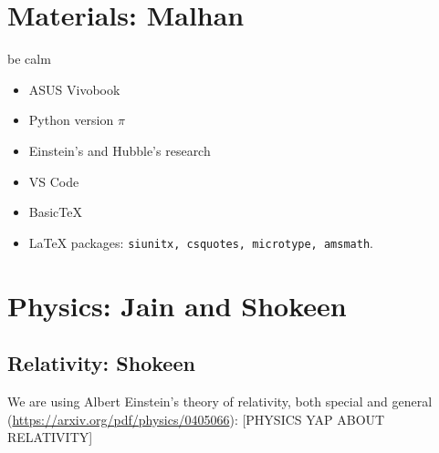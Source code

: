 \documentclass{article}
\begin{document}
\section{Materials: Malhan}
be calm
\begin{itemize}
    \item ASUS Vivobook
    \item Python version \(\pi\)
    \item Einstein's and Hubble's research
    \item VS Code
    \item Basic\TeX
    \item \LaTeX{} packages: \verb|siunitx, csquotes, microtype, amsmath|.
\end{itemize}

\section{Physics: Jain and Shokeen}
\subsection{Relativity: Shokeen}
We are using Albert Einstein's theory of relativity, both special and general (\url{https://arxiv.org/pdf/physics/0405066}):
[PHYSICS YAP ABOUT RELATIVITY]
\end{document}
